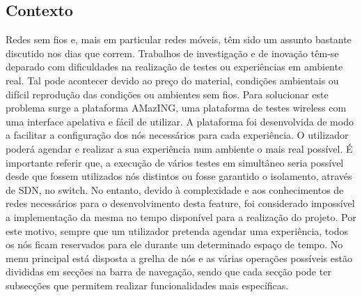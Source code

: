 \subsection{Contexto}
Redes sem fios e, mais em particular redes móveis, têm sido um assunto bastante discutido nos dias que correm. Trabalhos de investigação e de inovação têm-se deparado com dificuldades na realização de testes ou experiências em ambiente real. Tal pode acontecer devido ao preço do material, condições ambientais ou difícil reprodução das condições ou ambientes sem fios. Para solucionar este problema surge a plataforma AMazING, uma plataforma de testes wireless com uma interface apelativa e fácil de utilizar.\newline
A plataforma foi desenvolvida de modo a facilitar a configuração dos nós necessários para cada experiência. O utilizador poderá agendar e realizar a sua experiência num ambiente o mais real possível.\newline
É importante referir que, a execução de vários testes em simultâneo seria possível desde que fossem utilizados nós distintos ou fosse garantido o isolamento, através de SDN, no switch. No entanto, devido à complexidade e aos conhecimentos de redes necessários para o desenvolvimento desta feature, foi considerado impossível a implementação da mesma no tempo disponível para a realização do projeto.\newline
Por este motivo, sempre que um utilizador pretenda agendar uma experiência, todos os nós ficam reservados para ele durante um determinado espaço de tempo. 
No menu principal está disposta a grelha de nós e as várias operações possíveis estão divididas em secções na barra de navegação, sendo que cada secção pode ter subsecções que permitem realizar funcionalidades mais específicas.


